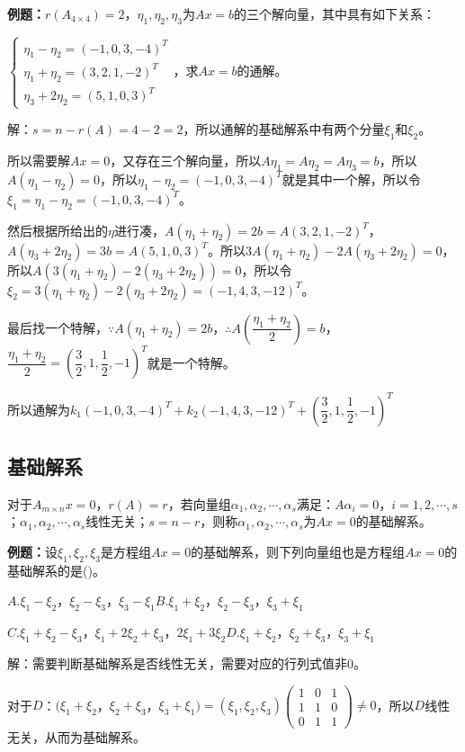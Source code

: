 \documentclass[UTF8, 12pt]{ctexart}
\begin{document}
\textbf{例题：}$r(A_{4\times4})=2$，$\eta_1,\eta_2,\eta_3$为$Ax=b$的三个解向量，其中具有如下关系：

$\left\{\begin{array}{l}
    \eta_1-\eta_2=(-1,0,3,-4)^T \\
    \eta_1+\eta_2=(3,2,1,-2)^T \\
    \eta_3+2\eta_2=(5,1,0,3)^T
\end{array}\right.$，求$Ax=b$的通解。

解：$s=n-r(A)=4-2=2$，所以通解的基础解系中有两个分量$\xi_1$和$\xi_2$。

所以需要解$Ax=0$，又存在三个解向量，所以$A\eta_1=A\eta_2=A\eta_3=b$，所以$A(\eta_1-\eta_2)=0$，所以$\eta_1-\eta_2=(-1,0,3,-4)^T$就是其中一个解，所以令$\xi_1=\eta_1-\eta_2=(-1,0,3,-4)^T$。

然后根据所给出的$\eta$进行凑，$A(\eta_1+\eta_2)=2b=A(3,2,1,-2)^T$，$A(\eta_3+2\eta_2)=3b=A(5,1,0,3)^T$。所以$3A(\eta_1+\eta_2)-2A(\eta_3+2\eta_2)=0$，所以$A(3(\eta_1+\eta_2)-2(\eta_3+2\eta_2))=0$，所以令$\xi_2=3(\eta_1+\eta_2)-2(\eta_3+2\eta_2)=(-1,4,3,-12)^T$。

最后找一个特解，$\because A(\eta_1+\eta_2)=2b$，$\therefore A\left(\dfrac{\eta_1+\eta_2}{2}\right)=b$，$\dfrac{\eta_1+\eta_2}{2}=\left(\dfrac{3}{2},1,\dfrac{1}{2},-1\right)^T$就是一个特解。

所以通解为$k_1(-1,0,3,-4)^T+k_2(-1,4,3,-12)^T+\left(\dfrac{3}{2},1,\dfrac{1}{2},-1\right)^T$

\subsection{基础解系}

对于$A_{m\times n}x=0$，$r(A)=r$，若向量组$\alpha_1,\alpha_2,\cdots,\alpha_s$满足：$A\alpha_i=0$，$i=1,2,\cdots,s$；$\alpha_1,\alpha_2,\cdots,\alpha_s$线性无关；$s=n-r$，则称$\alpha_1,\alpha_2,\cdots,\alpha_s$为$Ax=0$的基础解系。

\textbf{例题：}设$\xi_1,\xi_2,\xi_3$是方程组$Ax=0$的基础解系，则下列向量组也是方程组$Ax=0$的基础解系的是()。

$A.\xi_1-\xi_2$，$\xi_2-\xi_3$，$\xi_3-\xi_1$\qquad$B.\xi_1+\xi_2$，$\xi_2-\xi_3$，$\xi_3+\xi_1$

$C.\xi_1+\xi_2-\xi_3$，$\xi_1+2\xi_2+\xi_3$，$2\xi_1+3\xi_2$\qquad$D.\xi_1+\xi_2$，$\xi_2+\xi_3$，$\xi_3+\xi_1$

解：需要判断基础解系是否线性无关，需要对应的行列式值非0。\medskip

对于$D$：$(\xi_1+\xi_2$，$\xi_2+\xi_3$，$\xi_3+\xi_1)=(\xi_1,\xi_2,\xi_3)\left(\begin{array}{ccc}
    1 & 0 & 1 \\
    1 & 1 & 0 \\
    0 & 1 & 1
\end{array}\right)\neq0$，所以$D$线性无关，从而为基础解系。
\end{document}
